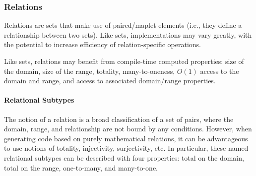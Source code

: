 \subsubsection{Relations}
Relations are sets that make use of paired/maplet elements (i.e., they define a relationship between two sets). Like sets, implementations may vary greatly, with the potential to increase efficiency of relation-specific operations.


Like sets, relations may benefit from compile-time computed properties: size of the domain, size of the range, totality, many-to-oneness, $O(1)$ access to the domain and range, and access to associated domain/range properties.





\paragraph{Relational Subtypes}
The notion of a relation is a broad classification of a set of pairs, where the domain, range, and relationship are not bound by any conditions. However, when generating code based on purely mathematical relations, it can be advantageous to use notions of totality, injectivity, surjectivity, etc. In particular, these named relational subtypes can be described with four properties: total on the domain, total on the range, one-to-many, and many-to-one.

